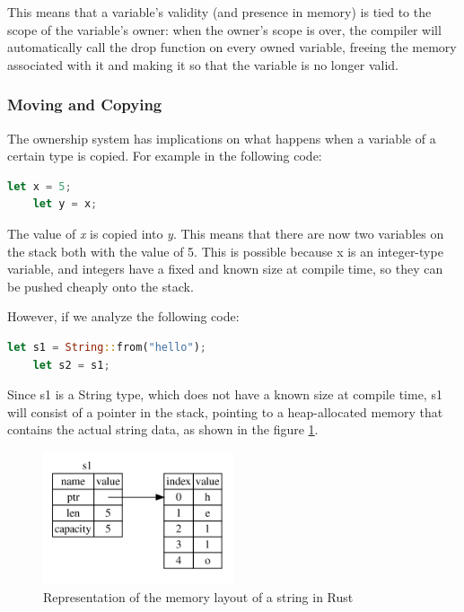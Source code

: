 This means that a variable's validity (and presence in memory) is tied to the scope of the variable's owner: when the owner's scope is over, the compiler will automatically
call the drop function on every owned variable, freeing the memory associated with it and making it so that the variable is no longer valid.

\subsubsection{Moving and Copying}
The ownership system has implications on what happens when a variable of a certain type is copied. For example in the following code:

\begin{lstlisting}[language=Rust]
    let x = 5;
    let y = x;
\end{lstlisting}

The value of \textit{x} is copied into \textit{y}. This means that there are now two variables on the stack both with the value of 5. This is possible because x is an integer-type variable,
and integers have a fixed and known size at compile time, so they can be pushed cheaply onto the stack.

However, if we analyze the following code:

\begin{lstlisting}[language=Rust]
    let s1 = String::from("hello");
    let s2 = s1;
\end{lstlisting}

Since s1 is a String type, which does not have a known size at compile time, s1 will consist of a pointer in the stack, pointing to a heap-allocated memory that contains the actual string data, as shown in the figure \ref{fig:string-memory-rep}.

\begin{figure}[h]
    \centering
    \includegraphics[width=0.5\textwidth]{figures/string-memory-rep.png}
    \caption{Representation of the memory layout of a string in Rust}
    \label{fig:string-memory-rep}
\end{figure}

